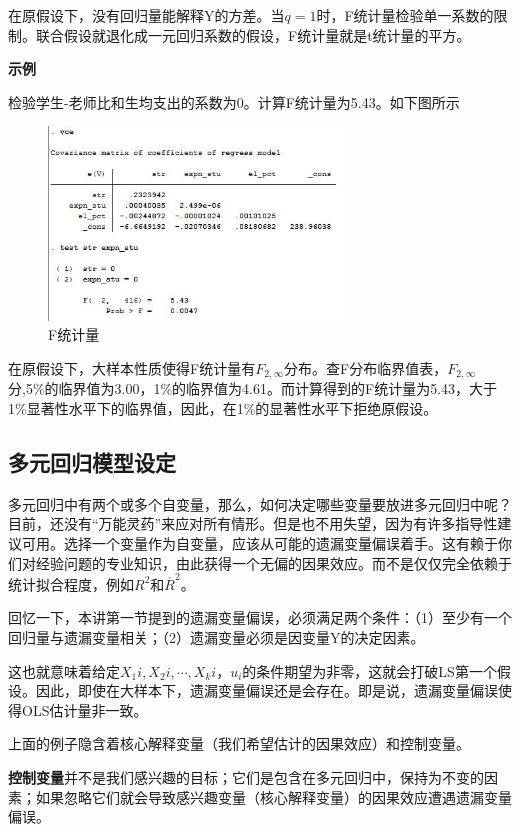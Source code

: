 \documentclass[cn,12pt,math=newtx,citestyle=gb7714-2015,bibstyle=gb7714-2015]{elegantbook}
\begin{document}
	在原假设下，没有回归量能解释Y的方差。当$q=1$时，F统计量检验单一系数的限制。联合假设就退化成一元回归系数的假设，F统计量就是t统计量的平方。
	
	\textbf{示例}
	
	检验学生-老师比和生均支出的系数为0。计算F统计量为5.43。如下图所示
	\begin{figure}[htbp]
		\centering
		\includegraphics[width=0.7\textwidth]{F2.jpg}
		\caption{F统计量}\label{fig:digit}
	\end{figure}
	
	在原假设下，大样本性质使得F统计量有$F_{2,\infty}$分布。查F分布临界值表，$F_{2,\infty}$分,5\%的临界值为3.00，1\%的临界值为4.61。而计算得到的F统计量为5.43，大于1\%显著性水平下的临界值，因此，在1\%的显著性水平下拒绝原假设。
	
	\subsection{多元回归模型设定}
	多元回归中有两个或多个自变量，那么，如何决定哪些变量要放进多元回归中呢？目前，还没有“万能灵药”来应对所有情形。但是也不用失望，因为有许多指导性建议可用。选择一个变量作为自变量，应该从可能的遗漏变量偏误着手。这有赖于你们对经验问题的专业知识，由此获得一个无偏的因果效应。而不是仅仅完全依赖于统计拟合程度，例如$R^2$和$\overline{R}^2$。
	
	回忆一下，本讲第一节提到的遗漏变量偏误，必须满足两个条件：（1）至少有一个回归量与遗漏变量相关；（2）遗漏变量必须是因变量Y的决定因素。
	
	这也就意味着给定$X_1i,X_2i,\cdots,X_ki$，$u_i$的条件期望为非零，这就会打破LS第一个假设。因此，即使在大样本下，遗漏变量偏误还是会存在。即是说，遗漏变量偏误使得OLS估计量非一致。
	
	上面的例子隐含着核心解释变量（我们希望估计的因果效应）和控制变量。
	
	\textbf{控制变量}并不是我们感兴趣的目标；它们是包含在多元回归中，保持为不变的因素；如果忽略它们就会导致感兴趣变量（核心解释变量）的因果效应遭遇遗漏变量偏误。
	
\end{document}
